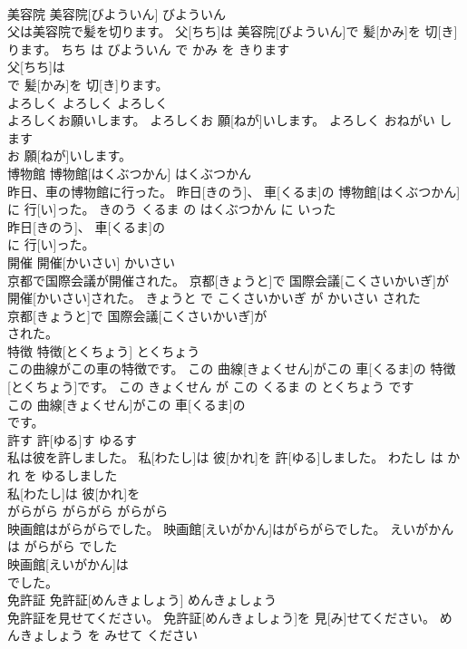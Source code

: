 \documentclass[8pt]{extreport}
\begin{document}
\begin{CJK}{UTF8}{min}
\\	美容院	美容院[びよういん]	びよういん	
\\	父は美容院で髪を切ります。	父[ちち]は 美容院[びよういん]で 髪[かみ]を 切[き]ります。	ちち は びよういん で かみ を きります	
\\	父[ちち]は
\\	で 髪[かみ]を 切[き]ります。		
\\	よろしく	よろしく	よろしく	
\\	よろしくお願いします。	よろしくお 願[ねが]いします。	よろしく おねがい します	
\\	お 願[ねが]いします。		
\\	博物館	博物館[はくぶつかん]	はくぶつかん	
\\	昨日、車の博物館に行った。	昨日[きのう]、 車[くるま]の 博物館[はくぶつかん]に 行[い]った。	きのう くるま の はくぶつかん に いった	
\\	昨日[きのう]、 車[くるま]の
\\	に 行[い]った。		
\\	開催	開催[かいさい]	かいさい	
\\	京都で国際会議が開催された。	京都[きょうと]で 国際会議[こくさいかいぎ]が 開催[かいさい]された。	きょうと で こくさいかいぎ が かいさい された	
\\	京都[きょうと]で 国際会議[こくさいかいぎ]が
\\	された。		
\\	特徴	特徴[とくちょう]	とくちょう	
\\	この曲線がこの車の特徴です。	この 曲線[きょくせん]がこの 車[くるま]の 特徴[とくちょう]です。	この きょくせん が この くるま の とくちょう です	
\\	この 曲線[きょくせん]がこの 車[くるま]の
\\	です。		
\\	許す	許[ゆる]す	ゆるす	
\\	私は彼を許しました。	私[わたし]は 彼[かれ]を 許[ゆる]しました。	わたし は かれ を ゆるしました	
\\	私[わたし]は 彼[かれ]を
\\	がらがら	がらがら	がらがら	
\\	映画館はがらがらでした。	映画館[えいがかん]はがらがらでした。	えいがかん は がらがら でした	
\\	映画館[えいがかん]は
\\	でした。		
\\	免許証	免許証[めんきょしょう]	めんきょしょう	
\\	免許証を見せてください。	免許証[めんきょしょう]を 見[み]せてください。	めんきょしょう を みせて ください	

\end{CJK}
\end{document}
